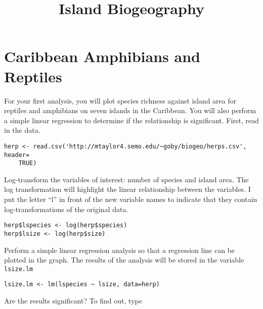 \documentclass[11pt]{article}
\title{Island Biogeography}
\author{}
\date{}							%
\begin{document}
\thispagestyle{empty}



\section{Caribbean Amphibians and Reptiles}

For your first analysis, you will plot species richness against island area for reptiles and amphibians on seven islands in the Caribbean. You will also perform a simple linear regression to determine if the relationship is significant. First, read in the data.

{\small 
\begin{verbatim}
herp <- read.csv('http://mtaylor4.semo.edu/~goby/biogeo/herps.csv', header=
    TRUE)
\end{verbatim}}

Log-transform the variables of interest: number of species and island area. The log transformation will highlight the linear relationship between the variables. I put the letter ``l'' in front of the new variable names to indicate that they contain log-transformations of the original data.

\begin{verbatim}
herp$lspecies <- log(herp$species)
herp$lsize <- log(herp$size)

\end{verbatim}

Perform a simple linear regression analysis so that a regression line can be plotted in the graph. The results of the analysis will be stored in the variable \texttt{lsize.lm}

\begin{verbatim}
lsize.lm <- lm(lspecies ~ lsize, data=herp)

\end{verbatim}

Are the results significant?  To find out, type
\end{document}

